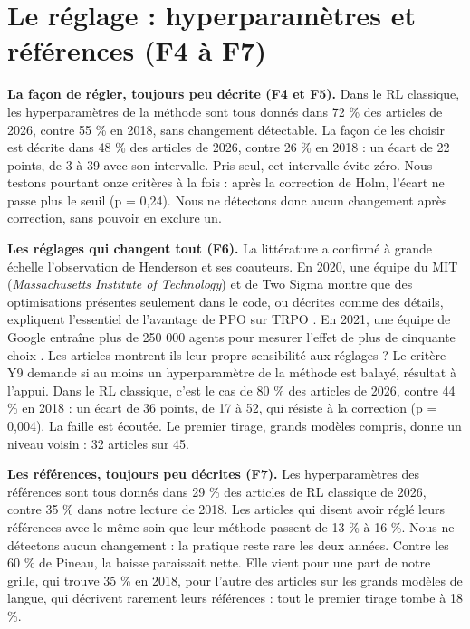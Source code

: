 \documentclass[11pt,a4paper]{article}
\begin{document}
\section{Le réglage : hyperparamètres et références (F4 à
F7)}\label{le-ruxe9glage-hyperparamuxe8tres-et-ruxe9fuxe9rences-f4-uxe0-f7}

\textbf{La façon de régler, toujours peu décrite (F4 et F5).} Dans le RL
classique, les hyperparamètres de la méthode sont tous donnés dans 72 \%
des articles de 2026, contre 55 \% en 2018, sans changement détectable.
La façon de les choisir est décrite dans 48 \% des articles de 2026,
contre 26 \% en 2018 : un écart de 22 points, de 3 à 39 avec son
intervalle. Pris seul, cet intervalle évite zéro. Nous testons pourtant
onze critères à la fois : après la correction de Holm, l'écart ne passe
plus le seuil (p = 0,24). Nous ne détectons donc aucun changement après
correction, sans pouvoir en exclure un.

\textbf{Les réglages qui changent tout (F6).} La littérature a confirmé
à grande échelle l'observation de Henderson et ses coauteurs. En 2020,
une équipe du MIT (\emph{Massachusetts Institute of Technology}) et de
Two Sigma montre que des optimisations présentes seulement dans le code,
ou décrites comme des détails, expliquent l'essentiel de l'avantage de
PPO sur TRPO \autocite{engstrom2020implementation}. En 2021, une équipe
de Google entraîne plus de 250 000 agents pour mesurer l'effet de plus
de cinquante choix \autocite{andrychowicz2021matters}. Les articles
montrent-ils leur propre sensibilité aux réglages ? Le critère Y9
demande si au moins un hyperparamètre de la méthode est balayé, résultat
à l'appui. Dans le RL classique, c'est le cas de 80 \% des articles de
2026, contre 44 \% en 2018 : un écart de 36 points, de 17 à 52, qui
résiste à la correction (p = 0,004). La faille est écoutée. Le premier
tirage, grands modèles compris, donne un niveau voisin : 32 articles sur
45.

\textbf{Les références, toujours peu décrites (F7).} Les hyperparamètres
des références sont tous donnés dans 29 \% des articles de RL classique
de 2026, contre 35 \% dans notre lecture de 2018. Les articles qui
disent avoir réglé leurs références avec le même soin que leur méthode
passent de 13 \% à 16 \%. Nous ne détectons aucun changement : la
pratique reste rare les deux années. Contre les 60 \% de Pineau, la
baisse paraissait nette. Elle vient pour une part de notre grille, qui
trouve 35 \% en 2018, pour l'autre des articles sur les grands modèles
de langue, qui décrivent rarement leurs références : tout le premier
tirage tombe à 18 \%.
\end{document}

